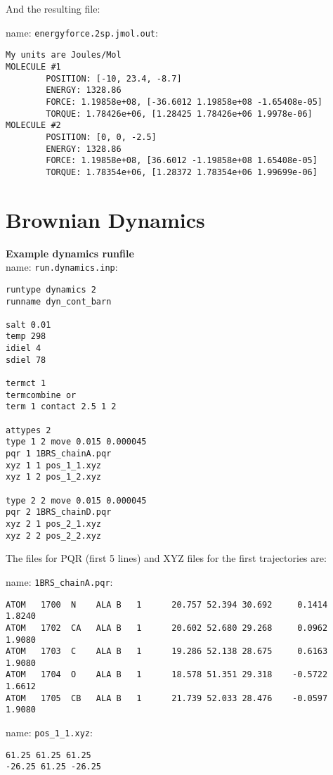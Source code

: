 And the resulting file: 

name: \texttt{energyforce.2sp.jmol.out}:
\begin{lstlisting}[style = MyBash]
My units are Joules/Mol
MOLECULE #1
        POSITION: [-10, 23.4, -8.7]
        ENERGY: 1328.86
        FORCE: 1.19858e+08, [-36.6012 1.19858e+08 -1.65408e-05]
        TORQUE: 1.78426e+06, [1.28425 1.78426e+06 1.9978e-06]
MOLECULE #2
        POSITION: [0, 0, -2.5]
        ENERGY: 1328.86
        FORCE: 1.19858e+08, [36.6012 -1.19858e+08 1.65408e-05]
        TORQUE: 1.78354e+06, [1.28372 1.78354e+06 1.99699e-06]
\end{lstlisting}


\section{Brownian Dynamics}

\textbf{Example dynamics runfile} \\

name:  \texttt{run.dynamics.inp}:
\begin{lstlisting}[style = MyBash]
runtype dynamics 2
runname dyn_cont_barn

salt 0.01
temp 298
idiel 4 
sdiel 78

termct 1
termcombine or
term 1 contact 2.5 1 2

attypes 2
type 1 2 move 0.015 0.000045
pqr 1 1BRS_chainA.pqr
xyz 1 1 pos_1_1.xyz
xyz 1 2 pos_1_2.xyz

type 2 2 move 0.015 0.000045
pqr 2 1BRS_chainD.pqr
xyz 2 1 pos_2_1.xyz
xyz 2 2 pos_2_2.xyz
\end{lstlisting}
\medskip

The files for PQR (first 5 lines) and XYZ files for the first trajectories are: 

name:  \texttt{1BRS\_chainA.pqr}:
\begin{lstlisting}[style = MyBash]
ATOM   1700  N    ALA B   1      20.757 52.394 30.692     0.1414  1.8240
ATOM   1702  CA   ALA B   1      20.602 52.680 29.268     0.0962  1.9080
ATOM   1703  C    ALA B   1      19.286 52.138 28.675     0.6163  1.9080
ATOM   1704  O    ALA B   1      18.578 51.351 29.318    -0.5722  1.6612
ATOM   1705  CB   ALA B   1      21.739 52.033 28.476    -0.0597  1.9080
\end{lstlisting}

\medskip

name:  \texttt{pos\_1\_1.xyz}:
\begin{lstlisting}[style = MyBash]
61.25 61.25 61.25
-26.25 61.25 -26.25
\end{lstlisting}
\medskip

